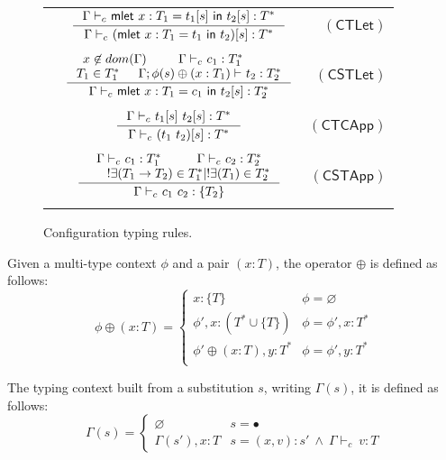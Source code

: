 \documentclass[preprint,authoryear,sort&compress,9pt,nocopyrightspace]{article}
\newcommand\rulename[1]{\mathsf{(#1)}}
\newcommand{\conf}[2][s]{(#2)[#1]}
\newcommand{\tyC}{{\Gamma \vdash_c \ }}
\newcommand{\enveC}{{\Gamma ;  \emt(s) \oplus (x : T_1) \vdash \ }}
\newcommand{\appD}{t_1 \ t_2}
\newcommand{\oletPT}[3]{\mathsf{mlet} \ x : #1 = #2 \ \mathsf{in}  \ #3}
\newcommand{\mtD}{T^{*}}
\newcommand{\mtP}[1]{#1^{*}}
\newcommand{\mtCu}[1]{\{ #1 \}}
\newcommand{\emt}{\phi}
\begin{document}
\begin{figure}
\begin{small}
\begin{center}
\begin{tabular}{|l c r|}
&$\inference{\tyC \oletPT{T_1}{t_1[s]}{t_2[s] : \mtP{T}}}{\tyC \conf{\oletPT{T_1}{t_1}{t_2}} : \mtP{T}}$&$\rulename{CTLet}$\\
&&\\
&$\inference{x \not \in dom(\Gamma) & \tyC c_1 : \mtP{T_1}  & \\ T_1 \in  \mtP{T_1}& \enveC t_2 : \mtP{T_2}}{\tyC \oletPT{T_1}{c_1}{t_2[s]} : \mtP{T_2}}$&$\rulename{CSTLet}$\\
&&\\
&$\inference {\tyC t_1[s] \ t_2[s] : \mtP{T}}{\tyC \conf{\appD} : \mtP{T}}$&$\rulename{CTCApp}$\\
&&\\
&$\inference {\tyC c_1 : T_1^{*} & \tyC c_2 : T_2^{*}  \\ & !\exists(T_1 \to T_2) \in T_1^{*}| !\exists(T_1) \in T_2^{*}}{\tyC c_1 \ c_2 : \{T_2\}}$&$\rulename{CSTApp}$\\
&&\\
\hline
\end{tabular}
\hspace*{-2.8cm}
\caption{Configuration typing rules.}
\label{tabla:sencillaA}
\end{center}

\end{small}
\end{figure}

\begin{definition}[$\oplus$]
\label{definition:tcs}
\mbox{}
Given a multi-type context $\emt$ and a pair $(x:T)$, the operator $\oplus$ is defined  as follows:
\[ \emt \oplus (x:T) = \begin{cases} 
      x:\mtCu{T}& \emt =  \varnothing \\
      \emt',x:(\mtD \cup \mtCu{T}) & \emt = \emt',x:\mtD\\
      \emt' \oplus (x:T),y:\mtD & \emt = \emt',y:\mtD\\
   \end{cases}
\]
\end{definition}

\begin{definition}[$\Gamma(s)$]
\label{definition:tcs}
\mbox{}
The typing context built from a substitution $s$, writing $\Gamma(s)$, it is defined as follows:
\[ \Gamma(s) = \begin{cases} 
     \varnothing & s =  \bullet \\
      \Gamma(s'), x:T & s = (x,v):s' \ \land \ \tyC v : T 
   \end{cases}
\]
\end{definition}
\end{document}
